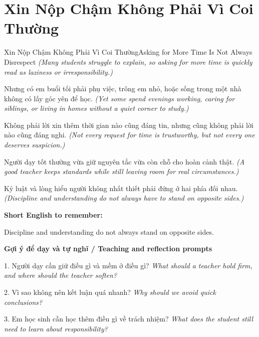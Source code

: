 \section{Xin Nộp Chậm Không Phải Vì Coi Thường}
\begin{truyen}{Xin Nộp Chậm Không Phải Vì Coi Thường}{Asking for More Time Is Not Always Disrespect}
\textit{(Many students struggle to explain, so asking for more time is quickly read as laziness or irresponsibility.)}

Nhưng có em buổi tối phải phụ việc, trông em nhỏ, hoặc sống trong một nhà không có lấy góc yên để học.
\textit{(Yet some spend evenings working, caring for siblings, or living in homes without a quiet corner to study.)}

Không phải lời xin thêm thời gian nào cũng đáng tin, nhưng cũng không phải lời nào cũng đáng nghi.
\textit{(Not every request for time is trustworthy, but not every one deserves suspicion.)}

Người dạy tốt thường vừa giữ nguyên tắc vừa còn chỗ cho hoàn cảnh thật.
\textit{(A good teacher keeps standards while still leaving room for real circumstances.)}

\end{truyen}

\begin{baihoc}
Kỷ luật và lòng hiểu người không nhất thiết phải đứng ở hai phía đối nhau.
\textit{(Discipline and understanding do not always have to stand on opposite sides.)}
\end{baihoc}

\begin{ghinhoanh}
\textbf{Short English to remember:}

Discipline and understanding do not always stand on opposite sides.

\end{ghinhoanh}

\begin{tuhocnhanh}
\textbf{Gợi ý để dạy và tự nghĩ / Teaching and reflection prompts}

1. Người dạy cần giữ điều gì và mềm ở điều gì? \textit{What should a teacher hold firm, and where should the teacher soften?}

2. Vì sao không nên kết luận quá nhanh? \textit{Why should we avoid quick conclusions?}

3. Em học sinh cần học thêm điều gì về trách nhiệm? \textit{What does the student still need to learn about responsibility?}
\end{tuhocnhanh}
\ngancach

